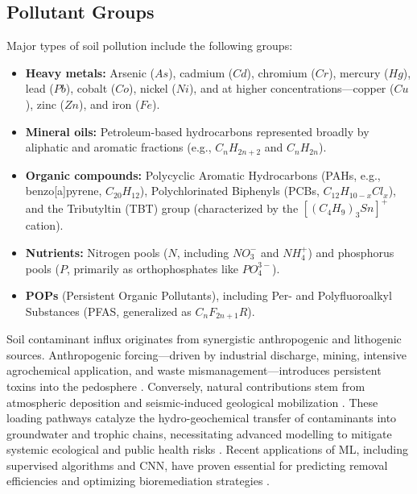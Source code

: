 \documentclass[land,article,submit,pdftex,moreauthors]{Definitions/mdpi}
\begin{document}
\subsection{Pollutant Groups}\label{sec2.1}

Major types of soil pollution include the following groups:

\begin{itemize}
    \item \textbf{Heavy metals:} Arsenic ($As$), cadmium ($Cd$), chromium ($Cr$),
        mercury ($Hg$), lead ($Pb$), cobalt ($Co$), nickel ($Ni$), and at higher
        concentrations---copper ($Cu$), zinc ($Zn$), and iron ($Fe$).
    \item \textbf{Mineral oils:} Petroleum-based hydrocarbons represented broadly
        by aliphatic and aromatic fractions (e.g., $C_nH_{2n+2}$ and $C_nH_{2n}$).
    \item \textbf{Organic compounds:} Polycyclic Aromatic Hydrocarbons (PAHs,
        e.g., benzo[a]pyrene, $C_{20}H_{12}$), Polychlorinated Biphenyls
        (PCBs, $C_{12}H_{10-x}Cl_x$), and the Tributyltin (TBT) group
        (characterized by the $[(C_4H_9)_3Sn]^+$ cation).
    \item \textbf{Nutrients:} Nitrogen pools ($N$, including $NO_3^-$ and $NH_4^+$)
        and phosphorus pools ($P$, primarily as orthophosphates like $PO_4^{3-}$).
    \item \textbf{POPs} (Persistent Organic Pollutants), including Per- and
        Polyfluoroalkyl Substances (PFAS, generalized as $C_nF_{2n+1}R$).
\end{itemize}

Soil contaminant influx originates from synergistic anthropogenic and
lithogenic sources. Anthropogenic forcing---driven by industrial discharge,
mining, intensive agrochemical application, and waste mismanagement---introduces
persistent toxins into the pedosphere \cite{Bwandamuka2025,Latif2026}.
Conversely, natural contributions stem from atmospheric deposition and
seismic-induced geological mobilization \cite{Binetti2026,Latif2026}. These
loading pathways catalyze the hydro-geochemical transfer of contaminants into
groundwater and trophic chains, necessitating advanced modelling to mitigate
systemic ecological and public health risks \cite{Elmotawakkil2025,Sanad2026}.
Recent applications of ML, including supervised algorithms and CNN, have proven
essential for predicting removal efficiencies and optimizing bioremediation
strategies \cite{Okafor2026,Pace2026}.
\end{document}
